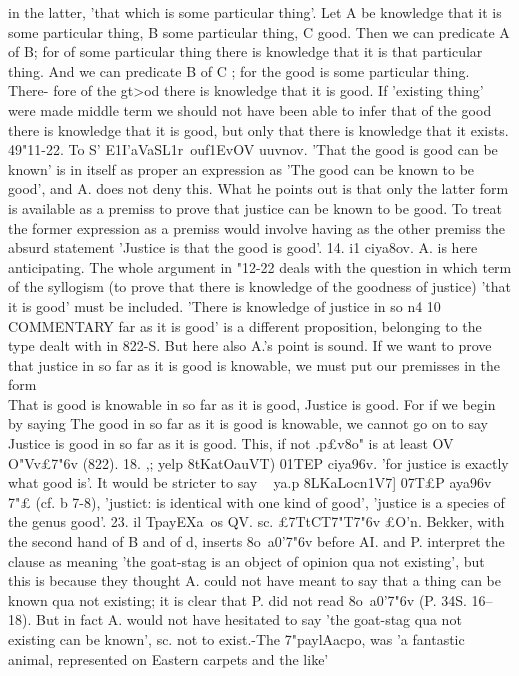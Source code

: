 {{{{{{{{{{{{{{{{{{{{{{{{{{{{in the latter, 'that which is some particular thing'. Let A be
knowledge that it is some particular thing, B some particular
thing, C good. Then we can predicate A of B; for of some particular
thing there is knowledge that it is that particular thing. And we
can predicate B of C ; for the good is some particular thing. There-
fore of the gt>od there is knowledge that it is good. If 'existing
thing' were made middle term we should not have been able to
infer that of the good there is knowledge that it is good, but only
that there is knowledge that it exists.
49"11-22. To S' E1I'aVaSL1r~ouf1EvOV
uuvnov. 'That the
good is good can be known' is in itself as proper an expression as
'The good can be known to be good', and A. does not deny this.
What he points out is that only the latter form is available as a
premiss to prove that justice can be known to be good. To treat
the former expression as a premiss would involve having as the
other premiss the absurd statement 'Justice is that the good is
good'.
14. i1 ciya8ov. A. is here anticipating. The whole argument
in "12-22 deals with the question in which term of the syllogism
(to prove that there is knowledge of the goodness of justice) 'that
it is good' must be included. 'There is knowledge of justice in so
n4 10
COMMENTARY
far as it is good' is a different proposition, belonging to the type
dealt with in 822-S. But here also A.'s point is sound. If we want
to prove that justice in so far as it is good is knowable, we must
put our premisses in the form \\That is good is knowable in so far
as it is good, Justice is good. For if we begin by saying The good
in so far as it is good is knowable, we cannot go on to say Justice
is good in so far as it is good. This, if not .p£v8o" is at least OV
O"Vv£7"6v (822).
18. ,; yelp 8tKatOauVT) 01TEP ciya96v. 'for justice is exactly what
good is'. It would be stricter to say ~ ya.p 8LKaLocn1V7] 07T£P aya96v
7"£ (cf. b 7-8), 'justict: is identical with one kind of good', 'justice
is a species of the genus good'.
23. il TpayEXa~os
QV. sc. £7TtCT7"T}7"6v £O'n. Bekker, with the
second hand of B and of d, inserts 8o~a0'7"6v before
AI. and P.
interpret the clause as meaning 'the goat-stag is an object of
opinion qua not existing', but this is because they thought A.
could not have meant to say that a thing can be known qua not
existing; it is clear that P. did not read 8o~a0'7"6v (P. 34S. 16--18).
But in fact A. would not have hesitated to say 'the goat-stag qua
not existing can be known', sc. not to exist.-The 7"paylAacpo, was
'a fantastic animal, represented on Eastern carpets and the like'
}}}}}}}}}}}}}}}}}}}}}}}}}}}
